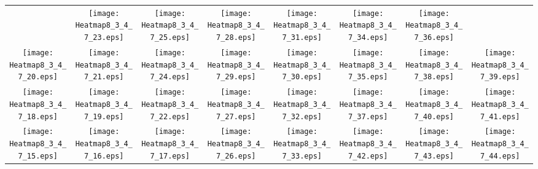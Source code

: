 \documentclass{standalone}
\begin{document}
\renewcommand{\arraystretch}{0}
\setlength{\tabcolsep}{0pt}
\begin{tabular}{ *8{c} }
 & \texttt{[image: Heatmap8\_3\_4\_7\_23.eps]} & \texttt{[image: Heatmap8\_3\_4\_7\_25.eps]} & \texttt{[image: Heatmap8\_3\_4\_7\_28.eps]} & \texttt{[image: Heatmap8\_3\_4\_7\_31.eps]} & \texttt{[image: Heatmap8\_3\_4\_7\_34.eps]} & \texttt{[image: Heatmap8\_3\_4\_7\_36.eps]} &  \\
\texttt{[image: Heatmap8\_3\_4\_7\_20.eps]} & \texttt{[image: Heatmap8\_3\_4\_7\_21.eps]} & \texttt{[image: Heatmap8\_3\_4\_7\_24.eps]} & \texttt{[image: Heatmap8\_3\_4\_7\_29.eps]} & \texttt{[image: Heatmap8\_3\_4\_7\_30.eps]} & \texttt{[image: Heatmap8\_3\_4\_7\_35.eps]} & \texttt{[image: Heatmap8\_3\_4\_7\_38.eps]} & \texttt{[image: Heatmap8\_3\_4\_7\_39.eps]} \\
\texttt{[image: Heatmap8\_3\_4\_7\_18.eps]} & \texttt{[image: Heatmap8\_3\_4\_7\_19.eps]} & \texttt{[image: Heatmap8\_3\_4\_7\_22.eps]} & \texttt{[image: Heatmap8\_3\_4\_7\_27.eps]} & \texttt{[image: Heatmap8\_3\_4\_7\_32.eps]} & \texttt{[image: Heatmap8\_3\_4\_7\_37.eps]} & \texttt{[image: Heatmap8\_3\_4\_7\_40.eps]} & \texttt{[image: Heatmap8\_3\_4\_7\_41.eps]} \\
\texttt{[image: Heatmap8\_3\_4\_7\_15.eps]} & \texttt{[image: Heatmap8\_3\_4\_7\_16.eps]} & \texttt{[image: Heatmap8\_3\_4\_7\_17.eps]} & \texttt{[image: Heatmap8\_3\_4\_7\_26.eps]} & \texttt{[image: Heatmap8\_3\_4\_7\_33.eps]} & \texttt{[image: Heatmap8\_3\_4\_7\_42.eps]} & \texttt{[image: Heatmap8\_3\_4\_7\_43.eps]} & \texttt{[image: Heatmap8\_3\_4\_7\_44.eps]} \\

\end{tabular}
\end{document}
